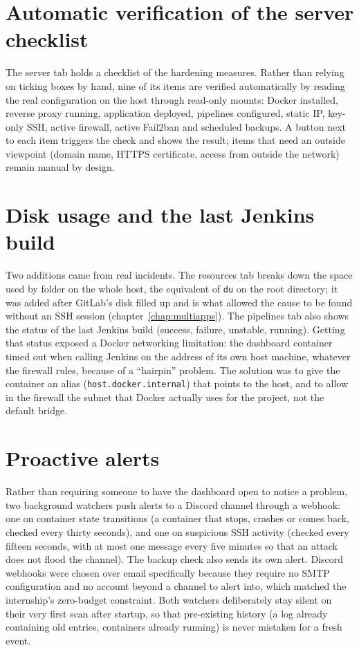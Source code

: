 \section{Automatic verification of the server checklist}
The server tab holds a checklist of the hardening measures. Rather than relying on ticking boxes by hand, nine of its items are verified automatically by reading the real configuration on the host through read-only mounts: Docker installed, reverse proxy running, application deployed, pipelines configured, static IP, key-only SSH, active firewall, active Fail2ban and scheduled backups. A button next to each item triggers the check and shows the result; items that need an outside viewpoint (domain name, HTTPS certificate, access from outside the network) remain manual by design.

\section{Disk usage and the last Jenkins build}
Two additions came from real incidents. The resources tab breaks down the space used by folder on the whole host, the equivalent of \texttt{du} on the root directory; it was added after GitLab's disk filled up and is what allowed the cause to be found without an SSH session (chapter~\ref{chap:multiapps}). The pipelines tab also shows the status of the last Jenkins build (success, failure, unstable, running). Getting that status exposed a Docker networking limitation: the dashboard container timed out when calling Jenkins on the address of its own host machine, whatever the firewall rules, because of a ``hairpin'' problem. The solution was to give the container an alias (\texttt{host.docker.internal}) that points to the host, and to allow in the firewall the subnet that Docker actually uses for the project, not the default bridge.

\section{Proactive alerts}
Rather than requiring someone to have the dashboard open to notice a problem, two background watchers push alerts to a Discord channel through a webhook: one on container state transitions (a container that stops, crashes or comes back, checked every thirty seconds), and one on suspicious SSH activity (checked every fifteen seconds, with at most one message every five minutes so that an attack does not flood the channel). The backup check also sends its own alert. Discord webhooks were chosen over email specifically because they require no SMTP configuration and no account beyond a channel to alert into, which matched the internship's zero-budget constraint. Both watchers deliberately stay silent on their very first scan after startup, so that pre-existing history (a log already containing old entries, containers already running) is never mistaken for a fresh event.

\clearpage
